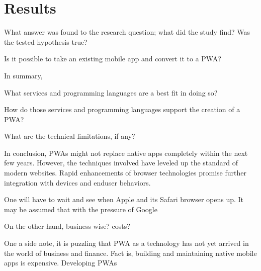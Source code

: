 \chapter{Results}

What answer was found to the research question; what did the study find? Was the tested hypothesis true?


Is it possible to take an existing mobile app and convert it to a PWA?

In summary,

What services and programming languages are a best fit in doing so?



How do those services and programming languages support the creation of a PWA?



What are the technical limitations, if any?

In conclusion, PWAs might not replace native apps completely within the next few years. However, the techniques involved have leveled up the standard of modern websites. Rapid enhancements of browser technologies promise further integration with devices and enduser behaviors.

One will have to wait and see when Apple and its Safari browser opens up. It may be assumed that with the pressure of Google


On the other hand, business wise? costs?


One a side note, it is puzzling that PWA as a technology has not yet arrived in the world of business and finance. Fact is, building and maintaining native mobile apps is expensive. Developing PWAs
